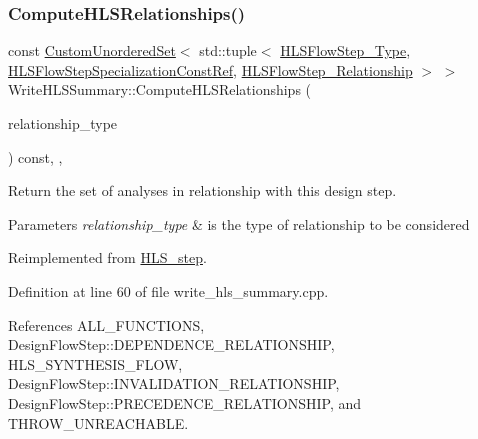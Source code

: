 \subsubsection{\texorpdfstring{Compute\+H\+L\+S\+Relationships()}{ComputeHLSRelationships()}}
{\footnotesize\ttfamily const \hyperlink{classCustomUnorderedSet}{Custom\+Unordered\+Set}$<$ std\+::tuple$<$ \hyperlink{hls__step_8hpp_ada16bc22905016180e26fc7e39537f8d}{H\+L\+S\+Flow\+Step\+\_\+\+Type}, \hyperlink{hls__step_8hpp_a5fdd2edf290c196531d21d68e13f0e74}{H\+L\+S\+Flow\+Step\+Specialization\+Const\+Ref}, \hyperlink{hls__step_8hpp_a3ad360b9b11e6bf0683d5562a0ceb169}{H\+L\+S\+Flow\+Step\+\_\+\+Relationship} $>$ $>$ Write\+H\+L\+S\+Summary\+::\+Compute\+H\+L\+S\+Relationships (\begin{DoxyParamCaption}\item[{const \hyperlink{classDesignFlowStep_a723a3baf19ff2ceb77bc13e099d0b1b7}{Design\+Flow\+Step\+::\+Relationship\+Type}}]{relationship\+\_\+type }\end{DoxyParamCaption}) const\hspace{0.3cm}{\ttfamily [override]}, {\ttfamily [protected]}, {\ttfamily [virtual]}}



Return the set of analyses in relationship with this design step. 


\begin{DoxyParams}{Parameters}
{\em relationship\+\_\+type} & is the type of relationship to be considered \\
\hline
\end{DoxyParams}


Reimplemented from \hyperlink{classHLS__step_aed0ce8cca9a1ef18e705fc1032ad4de5}{H\+L\+S\+\_\+step}.



Definition at line 60 of file write\+\_\+hls\+\_\+summary.\+cpp.



References A\+L\+L\+\_\+\+F\+U\+N\+C\+T\+I\+O\+NS, Design\+Flow\+Step\+::\+D\+E\+P\+E\+N\+D\+E\+N\+C\+E\+\_\+\+R\+E\+L\+A\+T\+I\+O\+N\+S\+H\+IP, H\+L\+S\+\_\+\+S\+Y\+N\+T\+H\+E\+S\+I\+S\+\_\+\+F\+L\+OW, Design\+Flow\+Step\+::\+I\+N\+V\+A\+L\+I\+D\+A\+T\+I\+O\+N\+\_\+\+R\+E\+L\+A\+T\+I\+O\+N\+S\+H\+IP, Design\+Flow\+Step\+::\+P\+R\+E\+C\+E\+D\+E\+N\+C\+E\+\_\+\+R\+E\+L\+A\+T\+I\+O\+N\+S\+H\+IP, and T\+H\+R\+O\+W\+\_\+\+U\+N\+R\+E\+A\+C\+H\+A\+B\+LE.

\mbox{\label{classWriteHLSSummary_ab846705e6c5c2b406578e5bf2a62ec2d}} 
